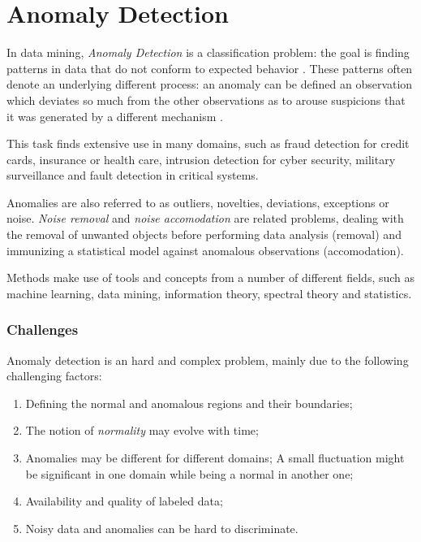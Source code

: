 \chapter{Anomaly Detection}

In data mining, \textit{Anomaly Detection} is a classification problem: the goal is finding patterns in data that do not conform to expected behavior \cite{chandola2009anomaly}. These patterns often denote an underlying different process: an anomaly can be defined an observation which deviates so much from the other observations as to arouse suspicions that it was generated by a different mechanism \cite{hawkins1980identification}.

This task finds extensive use in many domains, such as fraud detection for credit cards, insurance or health care, intrusion detection for cyber security, military surveillance and fault detection in critical systems.

Anomalies are also referred to as outliers, novelties, deviations, exceptions or noise. \textit{Noise removal} and \textit{noise accomodation} are related problems, dealing with the removal of unwanted objects before performing data analysis (removal) and immunizing a statistical model against anomalous observations (accomodation).

Methods make use of tools and concepts from a number of different fields, such as machine learning, data mining, information theory, spectral theory and statistics.

\subsection{Challenges}

Anomaly detection is an hard and complex problem, mainly due to the following challenging factors:

\begin{enumerate}
	\item Defining the normal and anomalous regions and their boundaries;
	\item The notion of \textit{normality} may evolve with time;
	\item Anomalies may be different for different domains; A small fluctuation might be significant in one domain while being a normal in another one;
	\item Availability and quality of labeled data;
	\item Noisy data and anomalies can be hard to discriminate.
\end{enumerate}

